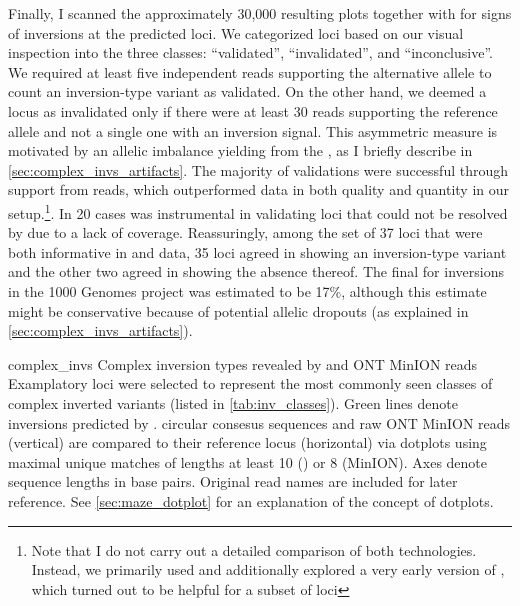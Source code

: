 Finally, I scanned the approximately 30,000 resulting plots together with
\adrian for signs of inversions at the predicted loci. We categorized loci based
on our visual inspection into the three classes: ``validated'', ``invalidated'',
and ``inconclusive''.  We required at least five independent reads supporting
the alternative allele to count an inversion-type variant as validated. On the
other hand, we deemed a locus as invalidated only if there were at least 30
reads supporting the reference allele and not a single one with an inversion
signal. This asymmetric measure is motivated by an allelic imbalance yielding
from the \pcr, as I briefly describe in \cref{sec:complex_invs_artifacts}. The
majority of validations were successful through support from \pacbio reads,
which outperformed \minion data in both quality and quantity in our
setup.\footnote{Note that I do not carry out a detailed comparison of both
technologies. Instead, we primarily used \pacbio and additionally explored a
very early version of \minion, which turned out to be helpful for a subset of
loci}. In 20 cases \minion was instrumental in validating loci that could not be
resolved by \pacbio due to a lack of coverage. Reassuringly, among the set of 37
loci that were both informative in \pacbio and \minion data, 35 loci agreed in
showing an inversion-type variant and the other two agreed in showing the
absence thereof. The final \fdr for inversions in the 1000 Genomes project was
estimated to be 17\%, although this estimate might be conservative because of
potential allelic dropouts (as explained in \cref{sec:complex_invs_artifacts}).

    {complex_invs}
    {Complex inversion types revealed by \pacbio and ONT MinION reads}
    {Examplatory loci were selected to represent the most commonly seen
    classes of complex inverted variants (listed in \cref{tab:inv_classes}).
    Green lines denote inversions predicted by \delly. \pacbio circular
    consesus sequences and raw ONT MinION reads (vertical) are compared to their
    reference locus (horizontal) via dotplots using maximal unique matches
    of lengths at least 10 (\pacbio) or 8 (MinION). Axes denote sequence lengths
    in base pairs. Original read names are included for later reference. See
    \cref{sec:maze_dotplot} for an explanation of the concept of dotplots.}

